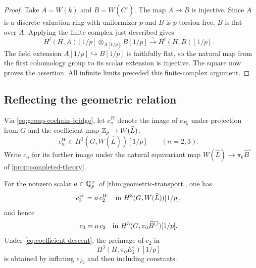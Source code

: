 \begin{proof}
Take $A=W(k)$ and $B=W(C^\flat)$.  The map $A\to B$ is injective.
Since $A$ is a discrete valuation ring with uniformizer $p$ and $B$
is $p$-torsion-free, $B$ is flat over $A$.  Applying the finite
complex just described gives
\begin{equation}\label{eq:witt-scalar-extension}
 H^i(H,A)[1/p]\otimes_{A[1/p]}B[1/p]
   \xrightarrow{\sim}H^i(H,B)[1/p].
\end{equation}
The field extension $A[1/p]\hookrightarrow B[1/p]$ is faithfully
flat, so the natural map from the first cohomology group to its
scalar extension is injective.  The square now proves the assertion.
All infinite limits preceded this finite-complex argument.
\end{proof}

\subsection{Reflecting the geometric relation}

Via \eqref{eq:group-cochain-bridge}, let $c_n^W$ denote the image of
$e_{P_n}$ under projection from $G$ and the coefficient map
$\mathbb Z_p\to W(\widehat L)$:
\[
 c_n^W\in H^3(G,W(\widehat L))[1/p]\qquad(n=2,3).
\]
Write $c_n$ for its further image under the natural equivariant map
$W(\widehat L)\to\pi_0\widehat B^{\square}$ of
\cref{prop:completed-theory}.

\begin{proposition}
\label{prop:coefficient-transport}
For the nonzero scalar $a\in\mathbb Q_p^\times$ of
\cref{thm:geometric-transport}, one has
\begin{equation}\label{eq:witt-relation}
 c_3^W=a\,c_2^W
       \quad\hbox{in }H^3(G,W(\widehat L))[1/p],
\end{equation}
and hence
\begin{equation}\label{eq:deformation-relation}
 c_3=a\,c_2
       \quad\hbox{in }H^3(G,\pi_0\widehat B^{\square})[1/p].
\end{equation}
Under \eqref{eq:coefficient-descent}, the preimage of $c_2$ in
\[
 H^3(H,\pi_0E_2^{\square})[1/p]
\]
is obtained by inflating $e_{P_2}$ and then including constants.
\end{proposition}


